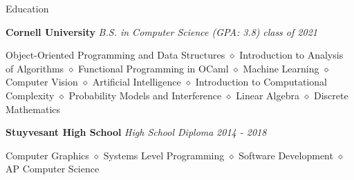 \documentclass{resume} %
\date{\specialdate\today}
\begin{document}






\begin{rSection}{Education}

{\bf Cornell University} \textit{B.S. in Computer Science (GPA: 3.8)}  \hfill {\em class of 2021}
\item Object-Oriented Programming and Data Structures $\diamond$  Introduction to Analysis of Algorithms $\diamond$ Functional Programming in OCaml $\diamond$ Machine Learning $\diamond$ Computer Vision $\diamond$ Artificial Intelligence $\diamond$ Introduction to Computational Complexity $\diamond$ Probability Models and Interference $\diamond$ Linear Algebra $\diamond$ Discrete Mathematics


{\bf Stuyvesant High School} \textit{High School Diploma}   \hfill {\em 2014 - 2018}
\item Computer Graphics $\diamond$ Systems Level Programming $\diamond$ Software Development $\diamond$ AP Computer Science


\end{rSection}




\end{document}
